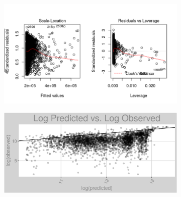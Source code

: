 \begin{figure}[h]
\centering
\begin{subfigure}{1\textwidth}
\centering
\includegraphics[width=.99\textwidth, height=0.475\textheight]{Images/natural_gas_psf_rf_res_2.png}
\end{subfigure}
\begin{subfigure}{1\textwidth}
\centering
\includegraphics[width=.99\textwidth, height=0.3\textheight]{Images/natural_gas_psf_rf_pvo.png}
\end{subfigure}
\end{figure}
\FloatBarrier
\newpage
